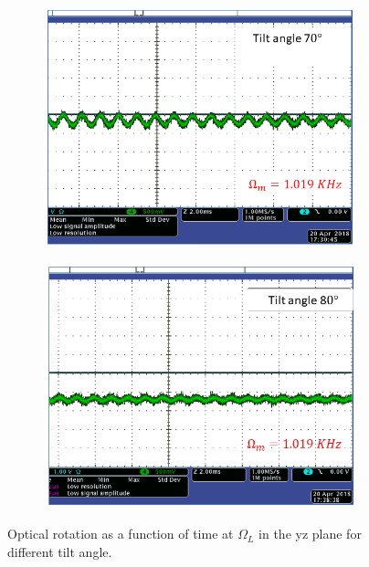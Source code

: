 \begin{figure}
    \begin{subfigure}[b]{0.45\textwidth}
        \centering
        \includegraphics[width=\textwidth,trim={0cm 0.5cm 3.2cm 0cm},clip]{figures/tilt3.png}
        \caption{}
        \label{fig:tilt_70_degree}
    \end{subfigure}
     \hfill
    \begin{subfigure}[b]{0.45\textwidth}
        \centering
        \includegraphics[width=\textwidth,trim={0.5cm 0.5cm 2.9cm 0cm},clip]{figures/tilt4.png}
        \caption{}
        \label{fig:tilt_80_degree}
    \end{subfigure}
    \caption{Optical rotation as a function of time at $\Omega_L$ in the yz plane for different tilt angle.\label{fig:optical-rotation-different-angle}}
\end{figure}
